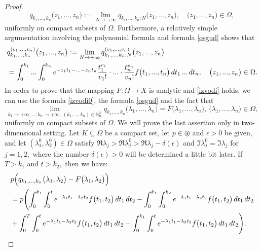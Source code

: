 \documentclass{amsart}
\theoremstyle{definition}
\theoremstyle{remark}
\numberwithin{equation}{section}
\begin{document}
\begin{proof}
$$
q_{k_{1},...,k_{n}}\bigl(z_{1},...,z_{n}\bigr):=\lim_{N\rightarrow +\infty}q_{k_{1},...,k_{n};N}\bigl(z_{1},...,z_{n}\bigr),\quad \bigl(z_{1},...,z_{n}\bigr)\in \Omega,
$$
uniformly on compact subsets of $\Omega.$ Furthermore, a relatively simple argumentation involving the polynomial formula and formula \eqref{osgud} shows that
\begin{align} \notag &
q_{k_{1},...,k_{n}}
^{(v_{1},...,v_{n})}\bigl(z_{1},...,z_{n}\bigr):=\lim_{N\rightarrow +\infty}q_{k_{1},...,k_{n};N}^{(v_{1},...,v_{n})}\bigl(z_{1},...,z_{n}\bigr)
\\\label{izvodi0} &  = \int^{k_{1}}_{0}...\int^{k_{n}}_{0}e^{-z_{1}t_{1}-...-z_{n}t_{n}} \frac{t_{1}^{v_{1}}}{v_{1}!}\cdot ...\cdot\frac{t_{n}^{v_{n}}}{v_{n}!} f\bigl(t_{1},...,t_{n}\bigr)\, dt_{1}\, ...\, dt_{n} ,\quad \bigl(z_{1},...,z_{n}\bigr)\in \Omega.
\end{align}
In order to prove that the mapping $F: \Omega \rightarrow X$ is analytic and \eqref{izvodi} holds, we can use the formula \eqref{izvodi0}, the formula \eqref{osgud} and the fact that 
$$
\lim_{k_{1}\rightarrow +\infty;...;k_{n}\rightarrow +\infty; \ (k_{1},...,k_{n})\in {\mathbb N}_{0}^{n}}q_{k_{1},...,k_{n}}\bigl(\lambda_{1},...,\lambda_{n}\bigr)=F\bigl(\lambda_{1},...,\lambda_{n}\bigr),\ \bigl(\lambda_{1},...,\lambda_{n}\bigr)\in \Omega,
$$
uniformly on compact subsets of $\Omega.$ We will prove the last assertion only in two-dimensional setting. Let $K\subseteq \Omega$ be a compact set, let $p\in  \circledast $ and $\epsilon>0$ be given, and let $(\lambda_{1}^{0},\lambda_{2}^{0})\in \Omega$ satisfy $\Re \lambda_{j}>\Re \lambda_{j}^{0}>\Re \lambda_{j}-\delta(\epsilon)$ and $\Im \lambda_{j}^{0}=\Im \lambda_{j}$ for $j=1,2,$ where the number $\delta(\epsilon)>0$ will be determined a little bit later. If $T>k_{1}$ and $t>k_{2},$ then we have:
\begin{align*} &
p\Bigl( q_{k_{1},...,k_{n}}\bigl(\lambda_{1},\lambda_{2}\bigr)-F\bigl(\lambda_{1},\lambda_{2}\bigr) \Bigr)
\\& =p\Biggl(  \int^{k_{1}}_{0}\int^{t}_{0}e^{-\lambda_{1}t_{1}-\lambda_{2}t_{2}}f\bigl( t_{1},t_{2}\bigr)\, dt_{1}\, dt_{2}- \int^{k_{1}}_{0}\int^{k_{2}}_{0}e^{-\lambda_{1}t_{1}-\lambda_{2}t_{2}}f\bigl( t_{1},t_{2}\bigr)\, dt_{1}\, dt_{2}
\\& +  \int^{T}_{0}\int^{t}_{0}e^{-\lambda_{1}t_{1}-\lambda_{2}t_{2}}f\bigl( t_{1},t_{2}\bigr)\, dt_{1}\, dt_{2}- \int^{k_{1}}_{0}\int^{t}_{0}e^{-\lambda_{1}t_{1}-\lambda_{2}t_{2}}f\bigl( t_{1},t_{2}\bigr)\, dt_{1}\, dt_{2}\Biggr) .
\end{align*}

\end{proof}
\end{document}
